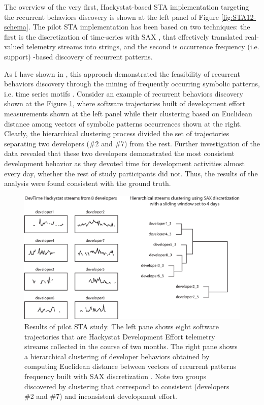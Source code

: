 The overview of the very first, Hackystat-based STA implementation targeting the recurrent behaviors 
discovery is shown at the left panel of Figure  \ref{fig:STA12-schema}.
The pilot STA implementation has been based on two techniques: the first is the discretization of time-series with 
SAX \cite{sax}, that effectively translated real-valued telemetry streams into strings, and the second is occurrence 
frequency (i.e. support) -based discovery of recurrent patterns.

As I have shown in \cite{csdl2-10-09}, this approach demonstrated the feasibility of recurrent behaviors discovery 
through the mining of frequently occurring symbolic patterns, i.e. time series motifs \cite{sax}. 
Consider an example of recurrent behaviors discovery shown at the Figure \ref{fig:STA1-results}, where software 
trajectories built of development effort measurements shown at the left panel while their clustering based on Euclidean 
distance among vectors of symbolic patterns occurrences shown at the right. Clearly, the hierarchical clustering 
process divided the set of trajectories separating two developers (\#2 and \#7) from the rest. 
Further investigation of the data revealed that these two developers demonstrated the most consistent development 
behavior as they devoted time for development activities almost every day, whether the rest of study participants 
did not. Thus, the results of the analysis were found consistent with the ground truth.

\begin{figure}[t]
   \centering
   \includegraphics[width=145mm]{figures/STA1.eps}
   \caption{Results of pilot STA study. 
   The left pane shows eight software trajectories that are Hackystat Development Effort telemetry streams \cite{citeulike:557296} 
   collected in the course of two months.
   The right pane shows a hierarchical clustering of developer behaviors obtained by computing Euclidean distance between vectors
   of recurrent patterns frequency built with SAX discretization \cite{sax}. 
   Note two groups discovered by clustering that correspond to consistent (developers \#2 and \#7) and inconsistent development effort.}
   \label{fig:STA1-results}
\end{figure}

